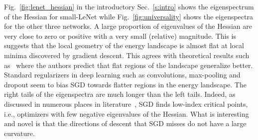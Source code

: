 \documentclass[10pt]{article}
\begin{document}
Fig.~\ref{fig:lenet_hessian} in the introductory Sec.~\ref{s:intro} shows the eigenspectrum of the Hessian for small-LeNet while Fig.~\ref{fig:universality} shows the eigenspectra for the other three networks.
%
A large proportion of eigenvalues of the Hessian are very close to zero or positive with a very small (relative) magnitude. This is suggests that the local geometry of the energy landscape is almost flat at local minima discovered by gradient descent. This agrees with theoretical results such as~\citet{baldassi2016local} where the authors predict that flat regions of the landscape generalize better. Standard regularizers in deep learning such as convolutions, max-pooling and dropout seem to bias SGD towards flatter regions in the energy landscape.
%
The right tails of the eigenspectra are much longer than the left tails. Indeed, as discussed in numerous places in literature~\citep{Bray2007,dauphin2014identifying,spinglass2015}, SGD finds low-index critical points, i.e., optimizers with few negative eigenvalues of the Hessian. What is interesting and novel is that the directions of descent that SGD misses do not have a large curvature.
\end{document}
